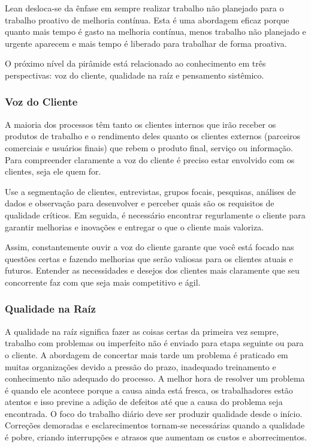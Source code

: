Lean desloca-se da ênfase em sempre realizar trabalho não planejado para o trabalho proativo de melhoria contínua. Esta é uma abordagem eficaz porque quanto mais tempo é gasto na melhoria contínua, menos trabalho não planejado e urgente aparecem e mais tempo é liberado para trabalhar de forma proativa.

O próximo nível da pirâmide está relacionado ao conhecimento em três perspectivas: voz do cliente, qualidade na raíz e pensamento sistêmico.

\subsubsection[Voz do Cliente]{Voz do Cliente}

A maioria dos processos têm tanto os clientes internos que irão receber os produtos de trabalho e o rendimento deles quanto os clientes externos (parceiros comerciais e usuários finais) que rebem o produto final, serviço ou informação. Para compreender claramente a voz do cliente é preciso estar envolvido com os clientes, seja ele quem for.

Use a segmentação de clientes, entrevistas, grupos focais, pesquisas, análises de dados e observação para desenvolver e perceber quais são os requisitos de qualidade críticos. Em seguida, é necessário encontrar regurlamente o cliente para garantir melhorias e inovações e entregar o que o cliente mais valoriza.

Assim, constantemente ouvir a voz do cliente garante que você está focado nas questões certas e fazendo melhorias que serão valiosas para os clientes atuais e futuros. Entender as necessidades e desejos dos clientes mais claramente que seu concorrente faz com que seja mais competitivo e ágil.

\subsubsection[Qualidade na Raíz]{Qualidade na Raíz}

A qualidade na raíz significa fazer as coisas certas da primeira vez sempre, trabalho com problemas ou imperfeito não é enviado para etapa seguinte ou para o cliente. A abordagem de concertar mais tarde um problema é praticado em muitas organizações devido a pressão do prazo, inadequado treinamento e conhecimento não adequado do processo.  A melhor hora de resolver um problema é quando ele acontece porque a causa ainda está fresca, os trabalhadores estão atentos e isso previne a adição de defeitos até que a causa do problema seja encontrada.  O foco do trabalho diário deve ser produzir qualidade desde o início. Correções demoradas e esclarecimentos tornam-se necessárias quando a qualidade é pobre, criando interrupções e atrasos que aumentam os custos e aborrecimentos.

